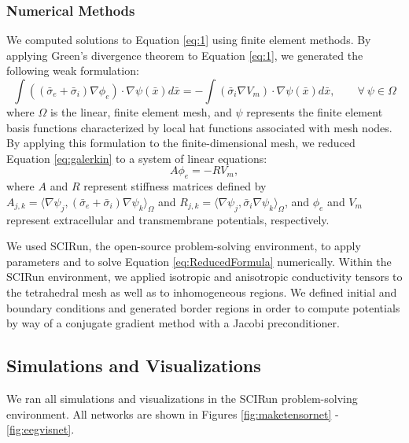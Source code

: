 \subsubsection{Numerical Methods}
\label{sec:numerical}


We computed solutions to Equation \ref{eq:1} using finite element methods.  By applying 
Green's divergence theorem to Equation \ref{eq:1}, we generated the following weak formulation:
\begin{equation}
\int ((\bar{\sigma}_e + \bar{\sigma}_i)\nabla \phi_e) \cdot \nabla \psi(\bar{x})d\bar{x} = - \int (\bar{\sigma}
_i \nabla V_m)\cdot \nabla \psi(\bar{x})d\bar{x}, \quad \quad \forall \ \psi \in \Omega
\label{eq:galerkin}
\end{equation}
where $\Omega$ is the linear, finite element mesh, and $\psi$ represents the finite element basis functions characterized by local hat functions associated with mesh nodes. By applying this formulation to the finite-dimensional mesh, we reduced Equation \ref{eq:galerkin} to a system of linear equations:
\begin{equation}
A \phi_e = -RV_m,
\label{eq:ReducedFormula}
\end{equation}
where $A$ and $R$ represent stiffness matrices defined by $A_{j,k} = \langle \nabla \psi_j,(\bar{\sigma}
_e + \bar{\sigma}_i)\nabla \psi_k \rangle_\Omega$ and $R_{j,k} = \langle \nabla \psi_j,\bar{\sigma}_i
\nabla \psi_k \rangle_\Omega$,
and $\phi_e$ and $V_m$ represent extracellular and transmembrane potentials, respectively.\cite{ref:fem}

We used SCIRun, the open-source problem-solving environment, to apply parameters and to solve Equation \ref{eq:ReducedFormula} numerically.  Within the SCIRun environment, we applied isotropic and anisotropic conductivity tensors to the tetrahedral mesh as well as to inhomogeneous regions. We defined initial and boundary conditions and generated border regions in order to compute potentials by way of a conjugate gradient method with a Jacobi preconditioner.

\subsection{Simulations and Visualizations}
\label{sec:sim}

We ran all simulations and visualizations in the SCIRun problem-solving environment. All networks are shown in Figures \ref{fig:maketensornet} - \ref{fig:eegvisnet}.

